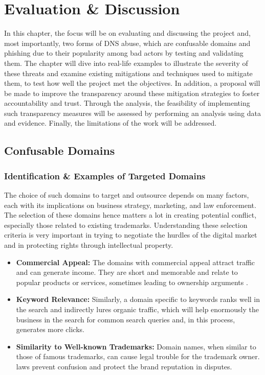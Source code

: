 \chapter{Evaluation \& Discussion}

In this chapter, the focus will be on evaluating and discussing the project and, most importantly, two forms of DNS abuse, which are confusable domains and phishing due to their popularity among bad actors by testing and validating them.  The chapter will dive into real-life examples to illustrate the severity of these threats and examine existing mitigations and techniques used to mitigate them, to test how well the project met the objectives. In addition, a proposal will be made to improve the transparency around these mitigation strategies to foster accountability and trust. Through the analysis, the feasibility of implementing such transparency measures will be assessed by performing an analysis using data and evidence. Finally, the limitations of the work will be addressed. 


\section{Confusable Domains}
\subsection{Identification \& Examples of Targeted Domains}

The choice of such domains to target and outsource depends on many factors, each with its implications on business strategy, marketing, and law enforcement. The selection of these domains hence matters a lot in creating potential conflict, especially those related to existing trademarks. Understanding these selection criteria is very important in trying to negotiate the hurdles of the digital market and in protecting rights through intellectual property.

\begin{itemize}
  \item \textbf{Commercial Appeal:} The domains with commercial appeal attract traffic and can generate income. They are short and memorable and relate to popular products or services, sometimes leading to ownership arguments \cite{Li2002ConflictDomainTrademark}.
  
  \item \textbf{Keyword Relevance:} Similarly, a domain specific to keywords ranks well in the search and indirectly lures organic traffic, which will help enormously the business in the search for common search queries and, in this process, generates more clicks.
  
  \item \textbf{Similarity to Well-known Trademarks:} Domain names, when similar to those of famous trademarks, can cause legal trouble for the trademark owner. laws prevent confusion and protect the brand reputation in disputes.
\end{itemize}


